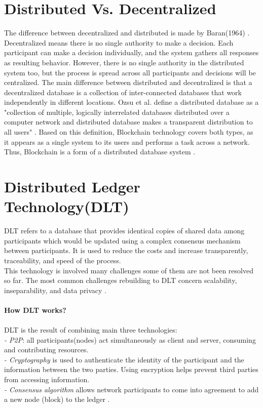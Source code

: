 \section{Distributed Vs. Decentralized } 
The difference between decentralized and distributed is made by Baran(1964) \cite{Baran}. Decentralized means there is no single authority to make a decision. Each participant can make a decision individually, and the system gathers all responses as resulting behavior. However, there is no single authority in the distributed system too, but the process is spread across all participants and decisions will be centralized. The main difference between distributed and decentralized is that a decentralized database is a collection of inter-connected databases that work independently in different locations. Ozsu et al.\cite{Ozsu} define a distributed database as a "collection of multiple, logically interrelated databases distributed over a computer network and distributed database makes a transparent distribution to all users" \cite{Ozsu}. Based on this definition, Blockchain technology covers both types, as it appears as a single system to its users and performs a task across a network. Thus, Blockchain is a form of a distributed database system \cite{Markos}.


\section{Distributed Ledger Technology(DLT)} 
DLT refers to a database that provides identical copies of shared data among participants which would be updated using a complex consensus mechanism between participants. It is used to reduce the costs and increase transparently, traceability, and speed of the process.\\
This technology is involved many challenges some of them are not been resolved so far. The most common challenges rebuilding to DLT concern scalability, inseparability, and data privacy \cite{Ugarte}. \\
\\
\textbf{How DLT works? }\\
\\
DLT is the result of combining main three technologies:\\
\hspace{1cm}\textit{-  P2P}: all participants(nodes) act simultaneously as client and server, consuming and contributing resources.\\
\hspace{1cm}\textit{- Cryptography} is used to authenticate the identity of the participant and the information between the two parties. Using encryption helps prevent third parties from accessing information. \\
\hspace{1cm}\textit{- Consensus algorithm} allows network participants to come into agreement to add a new node (block) to the ledger \cite{Ugarte}.\\
